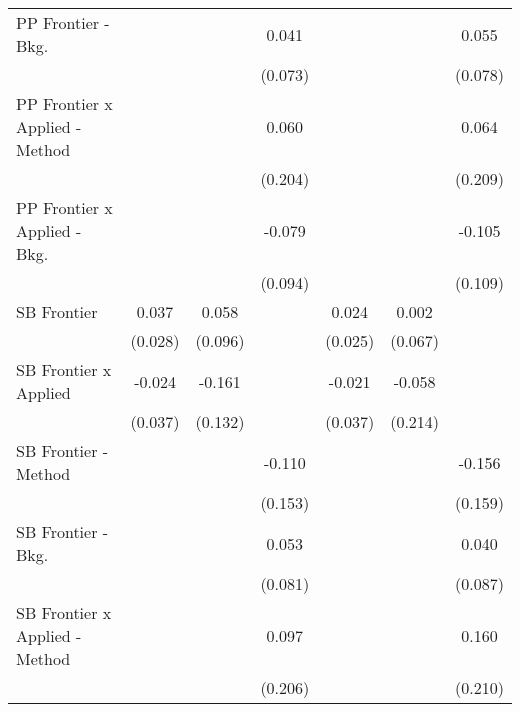 \begin{tabular}{lcccccc}
   PP Frontier - Bkg.             &              &             & 0.041          &                &             & 0.055\\   
                                  &              &             & (0.073)        &                &             & (0.078)\\   
   PP Frontier x Applied - Method &              &             & 0.060          &                &             & 0.064\\   
                                  &              &             & (0.204)        &                &             & (0.209)\\   
   PP Frontier x Applied - Bkg.   &              &             & -0.079         &                &             & -0.105\\   
                                  &              &             & (0.094)        &                &             & (0.109)\\   
   SB Frontier                    & 0.037        & 0.058       &                & 0.024          & 0.002       &   \\   
                                  & (0.028)      & (0.096)     &                & (0.025)        & (0.067)     &   \\   
   SB Frontier x Applied          & -0.024       & -0.161      &                & -0.021         & -0.058      &   \\   
                                  & (0.037)      & (0.132)     &                & (0.037)        & (0.214)     &   \\   
   SB Frontier - Method           &              &             & -0.110         &                &             & -0.156\\   
                                  &              &             & (0.153)        &                &             & (0.159)\\   
   SB Frontier - Bkg.             &              &             & 0.053          &                &             & 0.040\\   
                                  &              &             & (0.081)        &                &             & (0.087)\\   
   SB Frontier x Applied - Method &              &             & 0.097          &                &             & 0.160\\   
                                  &              &             & (0.206)        &                &             & (0.210)\\   

\end{tabular}
